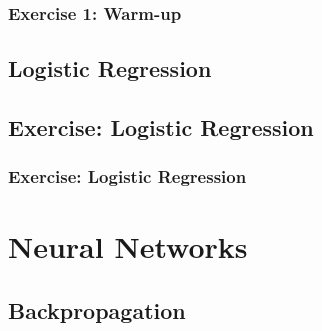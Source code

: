 \documentclass[aspectratio=169]{beamer}
\begin{document}
\begin{frame}
    \frametitle{Exercise 1: Warm-up}
    \begin{figure}
        \centering
    \end{figure}
\end{frame}

\subsection{Logistic Regression}
\label{subsec:logistic-regression}

\subsection{Exercise: Logistic Regression}
\label{subsec:exercise-logistic-regression}

\begin{frame}
    \frametitle{Exercise: Logistic Regression}
    \begin{figure}
        \centering
    \end{figure}
\end{frame}

\section{Neural Networks}
\label{sec:neural-networks}

\subsection{Backpropagation}
\label{subsec:Backpropagation}
\end{document}
